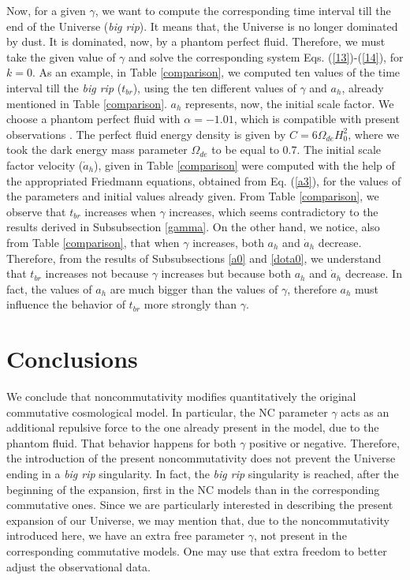 \documentclass[12pt]{article}
\newcommand{\0}{{(0)}}
\newcommand{\1}{{(1)}}
\newcommand{\2}{{(2)}}
\begin{document}
{Now, for a given $\gamma$, we want to compute the corresponding time interval till the end of the Universe ({\it big rip}).
It means that, the Universe is no longer dominated by dust. It is dominated, now, by a phantom perfect fluid.
Therefore, we must take the given value of $\gamma$ and solve the corresponding system Eqs. (\ref{13})-(\ref{14}),
for $k=0$. As an example, in Table \ref{comparison}, we computed ten values of the time 
interval till the {\it big rip} ($t_{br}$), using the ten different values of $\gamma$ and $a_h$, already mentioned in 
Table \ref{comparison}. $a_h$ represents, now, the initial scale factor. We choose a phantom perfect fluid with 
$\alpha=-1.01$, which is compatible with present observations \cite{riess}. The perfect fluid energy density is
given by $C=6\Omega_{de}H^2_0$, where we took the dark energy mass parameter $\Omega_{de}$ to be equal to 0.7.
The initial scale factor velocity ($\dot{a}_h$), given in Table \ref{comparison} were computed with the help of the 
appropriated Friedmann equations, obtained from Eq. (\ref{a3}), for the values of the parameters and initial values 
already given. From Table \ref{comparison}, we observe that $t_{br}$ increases when $\gamma$ increases, which seems contradictory
to the results derived in Subsubsection \ref{gamma}. On the other hand, we notice, also from Table \ref{comparison}, that
when $\gamma$ increases, both $a_h$ and $\dot{a}_h$ decrease. Therefore, from the results of Subsubsections \ref{a0} and
\ref{dota0}, we understand that $t_{br}$ increases not because $\gamma$ increases but because both $a_h$ and $\dot{a}_h$ 
decrease. In fact, the values of $a_h$ are much bigger than the values of $\gamma$, therefore $a_h$ must influence the
behavior of $t_{br}$ more strongly than $\gamma$.

\section{Conclusions}
\label{sec:conclusions}

We conclude that noncommutativity modifies quantitatively the original commutative cosmological model.
In particular, the NC parameter $\gamma$ acts as an additional repulsive force to the one already present in the model, 
due to the phantom fluid. That behavior happens for both $\gamma$ positive or negative. Therefore, the introduction of 
the present noncommutativity does not prevent the Universe ending in a {\it big rip} singularity. In fact, the {\it big rip}
singularity is reached, after the beginning of the expansion, first in the NC models than in the corresponding commutative 
ones. Since we are particularly interested in describing the present expansion of our Universe, we may mention that, due to 
the noncommutativity introduced here, we have an extra free parameter $\gamma$, not present in the corresponding
commutative models. One may use that extra freedom to better adjust the observational data. 

}
\end{document}
